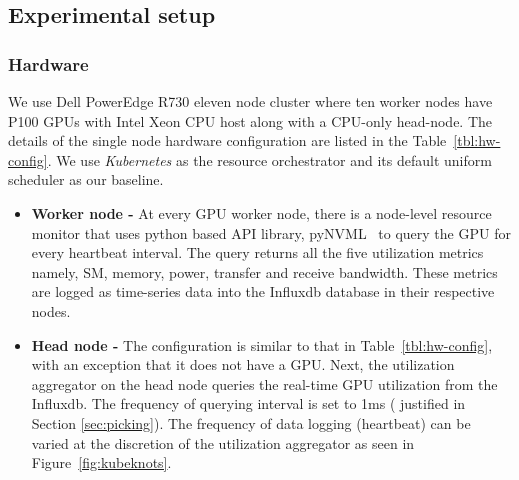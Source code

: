 \subsection{Experimental setup}
\subsubsection{Hardware}

We use Dell PowerEdge R730 eleven node cluster where ten worker nodes have P100 GPUs with Intel Xeon CPU host along with a CPU-only head-node. The details of the single node hardware configuration are listed in the Table~\ref{tbl:hw-config}. We use \textit{Kubernetes} as the resource orchestrator and its default uniform scheduler as our baseline.
\begin{itemize}[wide, nosep, labelindent = 0pt, topsep = 0.3ex]
\item{\textbf{Worker node -}} At every GPU worker node, there is a node-level resource monitor that uses python based API library, pyNVML~\cite{pynvml} to query the GPU for every heartbeat interval. The query returns all the five utilization metrics namely, SM, memory, power, transfer and receive bandwidth. These metrics are logged as time-series data into the Influxdb database in their respective nodes.
\item{\textbf{Head node -}} The configuration is similar to that in Table~\ref{tbl:hw-config}, with an exception that it does not have a GPU. Next, the utilization aggregator on the head node queries the real-time GPU utilization from the Influxdb. The frequency of querying interval is set to 1ms ( justified in Section \ref{sec:picking}). The frequency of data logging (heartbeat) can be varied at the discretion of the utilization aggregator as seen in Figure~\ref{fig:kubeknots}.
\end{itemize}

